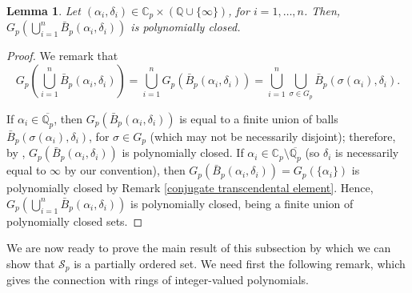 \documentclass[10pt]{article}
\numberwithin{equation}{section}
\newtheorem{Lem}[equation]{Lemma}
\theoremstyle{definition}
\theoremstyle{definition}
\newcommand{\Q}{\mathbb{Q}}
\newcommand{\C}{\mathbb{C}}
\newcommand{\oQp}{\overline{\Q_p}}
\begin{document}
\begin{Lem}\label{union balls pol closed}
Let $(\alpha_i,\delta_i)\in\C_p\times(\Q\cup\{\infty\})$, for $i=1,\ldots,n$. Then, $G_p(\bigcup\limits_{i=1}^n \bar B_p(\alpha_i,\delta_i))$ is polynomially closed.
\end{Lem}
\begin{proof}
We remark that
\begin{equation}\label{conjugates union balls}
G_p(\bigcup_{i=1}^n \bar B_p(\alpha_i,\delta_i))=\bigcup_{i=1}^n G_p(\bar B_p(\alpha_i,\delta_i))=\bigcup_{i=1}^n \bigcup_{\sigma\in G_p}\bar B_p(\sigma(\alpha_i),\delta_i).
\end{equation}

If $\alpha_i\in\oQp$, then $G_p(\bar B_p(\alpha_i,\delta_i))$ is equal to a finite union of balls $\bar B_p(\sigma(\alpha_i),\delta_i)$, 
for $\sigma\in G_p$ (which may not be necessarily disjoint); 
therefore, by \cite[Proposition 3.4]{ChabPolCloVal}, $G_p(\bar B_p(\alpha_i,\delta_i))$ is polynomially closed.
If $\alpha_i\in\C_p\setminus\oQp$ (so $\delta_i$ is necessarily equal to $\infty$ by our convention), 
then $G_p(\bar B_p(\alpha_i,\delta_i))=G_p(\{\alpha_i\})$ is polynomially closed by Remark \ref{conjugate transcendental element}.
Hence, $G_p(\bigcup\limits_{i=1}^n \bar B_p(\alpha_i,\delta_i))$ is polynomially closed, being a finite union of polynomially closed sets.
\end{proof}

We are now ready to prove the main result of this subsection by which we
can show that $\mathcal{S}_p$ is a partially ordered set. We need first the following remark, which gives the connection with rings of integer-valued polynomials.
\end{document}
